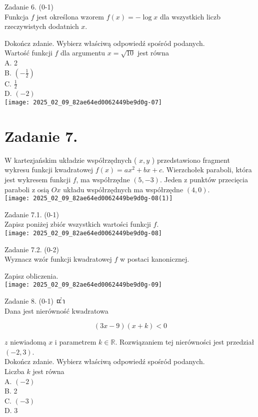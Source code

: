 \documentclass[10pt]{article}
\begin{document}
Zadanie 6. (0-1)\\
Funkcja \(f\) jest określona wzorem \(f(x)=-\log x\) dla wszystkich liczb rzeczywistych dodatnich \(x\).

Dokończ zdanie. Wybierz właściwą odpowiedź spośród podanych.\\
Wartość funkcji \(f\) dla argumentu \(x=\sqrt{10}\) jest równa\\
A. 2\\
B. \(\left(-\frac{1}{2}\right)\)\\
C. \(\frac{1}{2}\)\\
D. \((-2)\)\\
\texttt{[image: 2025\_02\_09\_82ae64ed0062449be9d0g-07]}

\section*{Zadanie 7.}
W kartezjańskim układzie współrzędnych ( \(x, y\) ) przedstawiono fragment wykresu funkcji kwadratowej \(f(x)=a x^{2}+b x+c\). Wierzchołek paraboli, która jest wykresem funkcji \(f\), ma współrzędne \((5,-3)\). Jeden z punktów przecięcia paraboli z osią \(O x\) układu współrzędnych ma współrzędne \((4,0)\).\\
\texttt{[image: 2025\_02\_09\_82ae64ed0062449be9d0g-08(1)]}

Zadanie 7.1. (0-1)\\
Zapisz poniżej zbiór wszystkich wartości funkcji \(f\).\\
\(\qquad\)\\
\texttt{[image: 2025\_02\_09\_82ae64ed0062449be9d0g-08]}

Zadanie 7.2. (0-2)\\
Wyznacz wzór funkcji kwadratowej \(f\) w postaci kanonicznej.

Zapisz obliczenia.\\
\texttt{[image: 2025\_02\_09\_82ae64ed0062449be9d0g-09]}

Zadanie 8. (0-1) ㄸำ\\
Dana jest nierówność kwadratowa

\[
(3 x-9)(x+k)<0
\]

\(z\) niewiadomą \(x\) i parametrem \(k \in \mathbb{R}\). Rozwiązaniem tej nierówności jest przedział \((-2,3)\).\\
Dokończ zdanie. Wybierz właściwą odpowiedź spośród podanych.\\
Liczba \(k\) jest równa\\
A. \((-2)\)\\
B. 2\\
C. \((-3)\)\\
D. 3
\end{document}
